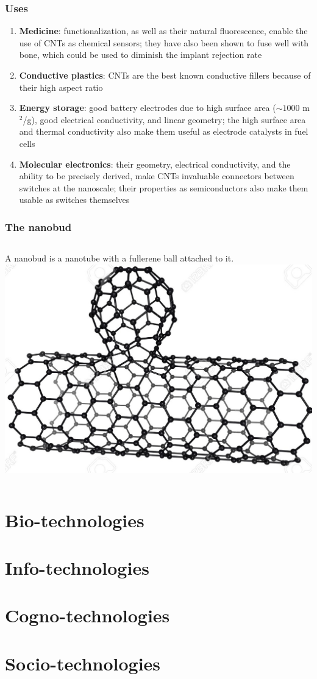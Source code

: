 \documentclass{beamer}
\begin{document}
\begin{frame}
	\frametitle{Uses}
	\begin{enumerate}
	\item \textbf{Medicine}: functionalization, as well as their natural fluorescence, enable the use of CNTs as chemical sensors; they have also been shown to fuse well with bone, which could be used to diminish the implant rejection rate
	\item \textbf{Conductive plastics}: CNTs are the best known conductive fillers because of their high aspect ratio
	\item \textbf{Energy storage}: good battery electrodes due to high surface area ($\sim 1000$ m$^2$/g), good electrical conductivity, and linear geometry; the high surface area and thermal conductivity also make them useful as electrode catalysts in fuel cells
	\item \textbf{Molecular electronics}: their geometry, electrical conductivity, and the ability to be precisely derived, make CNTs invaluable connectors between switches at the nanoscale; their properties as semiconductors also make them usable as switches themselves
	\end{enumerate}
\end{frame}

\begin{frame}
	\frametitle{The nanobud}
	\begin{columns}
			A nanobud is a nanotube with a fullerene ball attached to it.
			\includegraphics[scale=.15]{Nanobud}
	\end{columns}
\end{frame}

\section{Bio-technologies}

\section{Info-technologies}

\section{Cogno-technologies}

\section{Socio-technologies}
\end{document}
